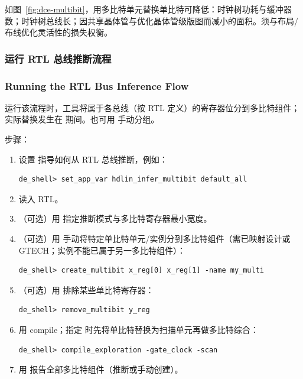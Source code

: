如图~\ref{fig:dce-multibit}，用多比特单元替换单比特可降低：时钟树功耗与缓冲器数；时钟树总线长；因共享晶体管与优化晶体管级版图而减小的面积。须与布局/布线优化灵活性的损失权衡。


\subsubsection{运行 RTL 总线推断流程}
\subsubsection*{Running the RTL Bus Inference Flow}

运行该流程时，工具将属于各总线（按 RTL 定义）的寄存器位分到多比特组件；实际替换发生在  期间。也可用  手动分组。

步骤：
\begin{enumerate}
  \item 设置  指导如何从 RTL 总线推断，例如：
\begin{lstlisting}
de_shell> set_app_var hdlin_infer_multibit default_all
\end{lstlisting}
  \item 读入 RTL。
  \item （可选）用  指定推断模式与多比特寄存器最小宽度。
  \item （可选）用  手动将特定单比特单元/实例分到多比特组件（需已映射设计或 GTECH；实例不能已属于另一多比特组件）：
\begin{lstlisting}
de_shell> create_multibit x_reg[0] x_reg[1] -name my_multi
\end{lstlisting}
  \item （可选）用  排除某些单比特寄存器：
\begin{lstlisting}
de_shell> remove_multibit y_reg
\end{lstlisting}
  \item 用  compile；指定  时先将单比特替换为扫描单元再做多比特综合：
\begin{lstlisting}
de_shell> compile_exploration -gate_clock -scan
\end{lstlisting}
  \item 用  报告全部多比特组件（推断或手动创建）。
\end{enumerate}

